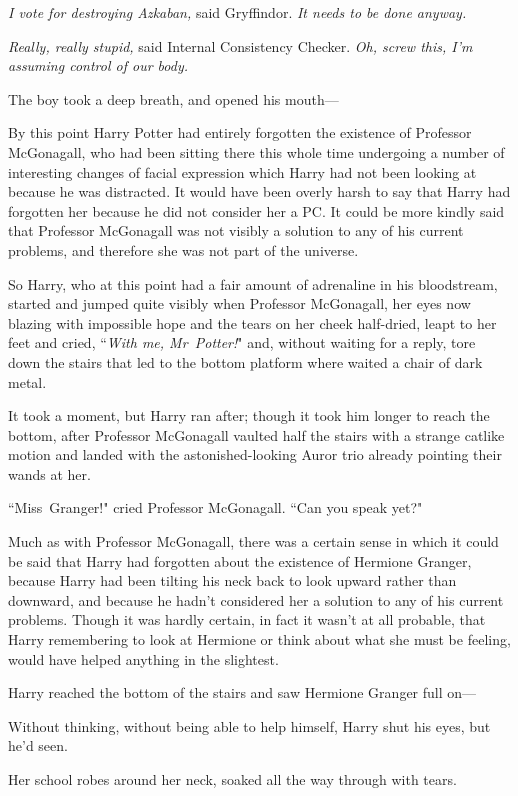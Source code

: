 \emph{I vote for destroying Azkaban,} said Gryffindor. \emph{It needs to be done anyway.}

\emph{Really, really stupid,} said Internal Consistency Checker. \emph{Oh, screw this, I'm assuming control of our body.}

The boy took a deep breath, and opened his mouth—

By this point Harry Potter had entirely forgotten the existence of Professor McGonagall, who had been sitting there this whole time undergoing a number of interesting changes of facial expression which Harry had not been looking at because he was distracted. It would have been overly harsh to say that Harry had forgotten her because he did not consider her a PC. It could be more kindly said that Professor McGonagall was not visibly a solution to any of his current problems, and therefore she was not part of the universe.

So Harry, who at this point had a fair amount of adrenaline in his bloodstream, started and jumped quite visibly when Professor McGonagall, her eyes now blazing with impossible hope and the tears on her cheek half-dried, leapt to her feet and cried, ``\emph{With me, Mr~Potter!}" and, without waiting for a reply, tore down the stairs that led to the bottom platform where waited a chair of dark metal.

It took a moment, but Harry ran after; though it took him longer to reach the bottom, after Professor McGonagall vaulted half the stairs with a strange catlike motion and landed with the astonished-looking Auror trio already pointing their wands at her.

``Miss~Granger!" cried Professor McGonagall. ``Can you speak yet?"

Much as with Professor McGonagall, there was a certain sense in which it could be said that Harry had forgotten about the existence of Hermione Granger, because Harry had been tilting his neck back to look upward rather than downward, and because he hadn't considered her a solution to any of his current problems. Though it was hardly certain, in fact it wasn't at all probable, that Harry remembering to look at Hermione or think about what she must be feeling, would have helped anything in the slightest.

Harry reached the bottom of the stairs and saw Hermione Granger full on—

Without thinking, without being able to help himself, Harry shut his eyes, but he'd seen.

Her school robes around her neck, soaked all the way through with tears.

